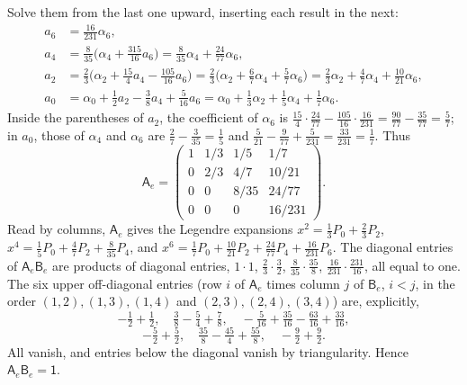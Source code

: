 Solve them from the last one upward, inserting each result in the next:
\begin{align*}
a_6&=\tfrac{16}{231}\alpha_6,\\
a_4&=\tfrac8{35}\bigl(\alpha_4+\tfrac{315}{16}a_6\bigr)
=\tfrac8{35}\alpha_4+\tfrac{24}{77}\alpha_6,\\
a_2&=\tfrac23\bigl(\alpha_2+\tfrac{15}4a_4-\tfrac{105}{16}a_6\bigr)
=\tfrac23\bigl(\alpha_2+\tfrac67\alpha_4+\tfrac57\alpha_6\bigr)
=\tfrac23\alpha_2+\tfrac47\alpha_4+\tfrac{10}{21}\alpha_6,\\
a_0&=\alpha_0+\tfrac12a_2-\tfrac38a_4+\tfrac5{16}a_6
=\alpha_0+\tfrac13\alpha_2+\tfrac15\alpha_4+\tfrac17\alpha_6.
\end{align*}
Inside the parentheses of $a_2$, the coefficient of $\alpha_6$ is
$\frac{15}4\cdot\frac{24}{77}-\frac{105}{16}\cdot\frac{16}{231}
=\frac{90}{77}-\frac{35}{77}=\frac57$; in $a_0$, those of $\alpha_4$ and
$\alpha_6$ are $\frac27-\frac3{35}=\frac15$ and
$\frac5{21}-\frac9{77}+\frac5{231}=\frac{33}{231}=\frac17$.
Thus
\[
\boxed{\mathsf A_e=
\begin{pmatrix}
1&1/3&1/5&1/7\\
0&2/3&4/7&10/21\\
0&0&8/35&24/77\\
0&0&0&16/231
\end{pmatrix}}.
\]
Read by columns, $\mathsf A_e$ gives the Legendre expansions
$x^2=\frac13P_0+\frac23P_2$, $x^4=\frac15P_0+\frac47P_2+\frac8{35}P_4$,
and $x^6=\frac17P_0+\frac{10}{21}P_2+\frac{24}{77}P_4+\frac{16}{231}P_6$.
The diagonal entries of $\mathsf A_e\mathsf B_e$ are products of
diagonal entries, $1\cdot1$, $\frac23\cdot\frac32$,
$\frac8{35}\cdot\frac{35}8$, $\frac{16}{231}\cdot\frac{231}{16}$, all
equal to one. The six upper off-diagonal entries (row $i$ of
$\mathsf A_e$ times column $j$ of $\mathsf B_e$, $i<j$, in the order
$(1,2),(1,3),(1,4)$ and $(2,3),(2,4),(3,4)$) are, explicitly,
\[
-\tfrac12+\tfrac12,\quad
\tfrac38-\tfrac54+\tfrac78,\quad
-\tfrac5{16}+\tfrac{35}{16}-\tfrac{63}{16}+\tfrac{33}{16},
\]
\[
-\tfrac52+\tfrac52,\quad
\tfrac{35}{8}-\tfrac{45}{4}+\tfrac{55}{8},\quad
-\tfrac92+\tfrac92.
\]
All vanish, and entries below the diagonal vanish by triangularity.
Hence $\mathsf A_e\mathsf B_e=\mathsf1$.

